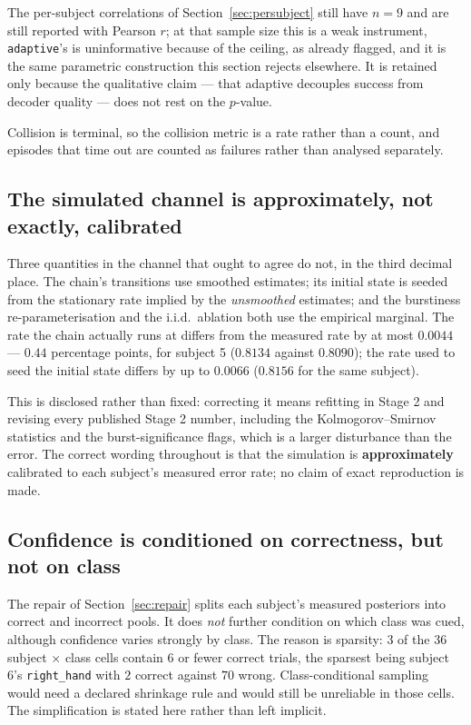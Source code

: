 \documentclass[11pt,a4paper]{article}
\newcommand{\vadapt}{\texttt{adaptive}}
\theoremstyle{plain}
\theoremstyle{definition}
\begin{document}
The per-subject correlations of Section~\ref{sec:persubject} still have
$n = 9$ and are still reported with Pearson $r$; at that sample size this
is a weak instrument, \vadapt{}'s is uninformative because of the
ceiling, as already flagged, and it is the same parametric construction this section rejects
elsewhere. It is retained only because the qualitative claim ---
that adaptive decouples success from decoder quality --- does not rest on
the $p$-value.

Collision is terminal, so the collision metric is a rate rather than a
count, and episodes that time out are counted as failures rather than
analysed separately.

\subsection{The simulated channel is approximately, not exactly, calibrated}

Three quantities in the channel that ought to agree do not, in the third
decimal place. The chain's transitions use smoothed estimates; its
initial state is seeded from the stationary rate implied by the
\emph{unsmoothed} estimates; and the burstiness re-parameterisation and
the i.i.d.\ ablation both use the empirical marginal. The rate the
chain actually runs at differs from the measured rate by at most
$0.0044$ --- $0.44$ percentage points, for subject 5 ($0.8134$ against
$0.8090$); the rate used to seed the initial state differs by up to
$0.0066$ ($0.8156$ for the same subject).

This is disclosed rather than fixed: correcting it means refitting in
Stage 2 and revising every published Stage 2 number, including the
Kolmogorov--Smirnov statistics and the burst-significance flags, which is
a larger disturbance than the error. The correct wording throughout is
that the simulation is \textbf{approximately} calibrated to each
subject's measured error rate; no claim of exact reproduction is made.

\subsection{Confidence is conditioned on correctness, but not on class}

The repair of Section~\ref{sec:repair} splits each subject's measured
posteriors into correct and incorrect pools. It does \emph{not} further
condition on which class was cued, although confidence varies strongly by
class. The reason is sparsity: $3$ of the $36$ subject $\times$ class
cells contain $6$ or fewer correct trials, the sparsest being subject 6's
\texttt{right\_hand} with $2$ correct against $70$ wrong. Class-conditional
sampling would need a declared shrinkage rule and would still be
unreliable in those cells. The simplification is stated here rather than
left implicit.
\end{document}
